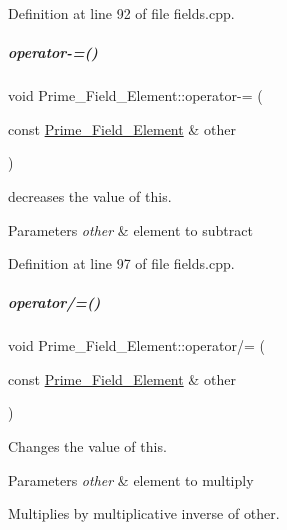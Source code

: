 Definition at line 92 of file fields.\+cpp.

\mbox{\label{group___fields_group_a19e1cde9dd774d554d8a1d5889a23344}} 
\subparagraph{\texorpdfstring{operator-\/=()}{operator-=()}}
{\footnotesize\ttfamily void Prime\+\_\+\+Field\+\_\+\+Element\+::operator-\/= (\begin{DoxyParamCaption}\item[{const \hyperlink{group___fields_group_class_prime___field___element}{Prime\+\_\+\+Field\+\_\+\+Element} \&}]{other }\end{DoxyParamCaption})}



decreases the value of {\ttfamily this}. 


\begin{DoxyParams}{Parameters}
{\em other} & element to subtract \\
\hline
\end{DoxyParams}


Definition at line 97 of file fields.\+cpp.

\mbox{\label{group___fields_group_a73d679e6a6f2f55ac8f2873cfb11f91b}} 
\subparagraph{\texorpdfstring{operator/=()}{operator/=()}}
{\footnotesize\ttfamily void Prime\+\_\+\+Field\+\_\+\+Element\+::operator/= (\begin{DoxyParamCaption}\item[{const \hyperlink{group___fields_group_class_prime___field___element}{Prime\+\_\+\+Field\+\_\+\+Element} \&}]{other }\end{DoxyParamCaption})}



Changes the value of {\ttfamily this}. 


\begin{DoxyParams}{Parameters}
{\em other} & element to multiply\\
\hline
\end{DoxyParams}
Multiplies by multiplicative inverse of {\ttfamily other}. 

